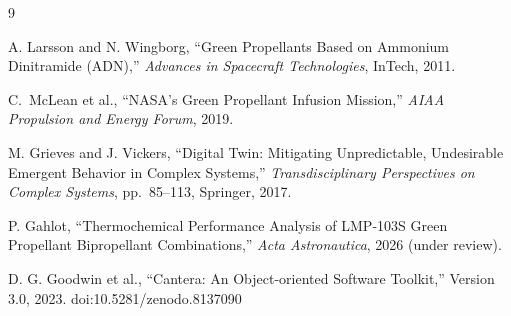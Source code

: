\documentclass[]{aiaa-tc}
\begin{document}

\begin{thebibliography}{9}

A. Larsson and N. Wingborg,
``Green Propellants Based on Ammonium Dinitramide (ADN),''
\textit{Advances in Spacecraft Technologies}, InTech, 2011.

C.~McLean et al., ``NASA's Green Propellant Infusion Mission,''
\textit{AIAA Propulsion and Energy Forum}, 2019.

M. Grieves and J. Vickers,
``Digital Twin: Mitigating Unpredictable, Undesirable
Emergent Behavior in Complex Systems,''
\textit{Transdisciplinary Perspectives on Complex Systems},
pp.~85--113, Springer, 2017.

P. Gahlot,
``Thermochemical Performance Analysis of LMP-103S Green
Propellant Bipropellant Combinations,''
\textit{Acta Astronautica}, 2026 (under review).

D. G. Goodwin et al.,
``Cantera: An Object-oriented Software Toolkit,''
Version 3.0, 2023.
doi:10.5281/zenodo.8137090

\end{thebibliography}
\end{document}
